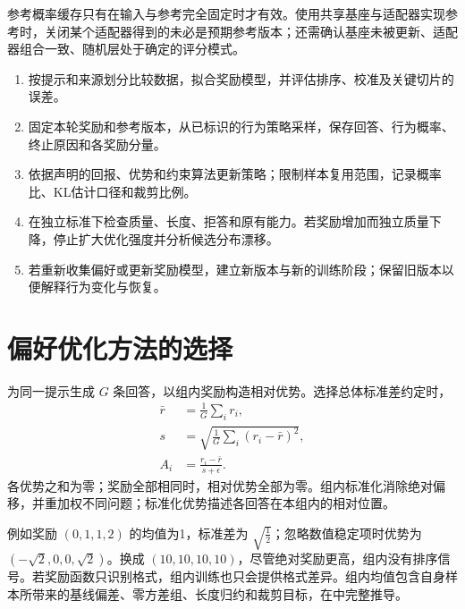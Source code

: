 \documentclass[../textbook.tex]{subfiles}
\begin{document}
参考概率缓存只有在输入与参考完全固定时才有效。使用共享基座与适配器实现参考时，关闭某个适配器得到的未必是预期参考版本；还需确认基座未被更新、适配器组合一致、随机层处于确定的评分模式。

\begin{algorithm}[奖励模型与在线策略的分阶段更新]
\begin{enumerate}
\item 按提示和来源划分比较数据，拟合奖励模型，并评估排序、校准及关键切片的误差。
\item 固定本轮奖励和参考版本，从已标识的行为策略采样，保存回答、行为概率、终止原因和各奖励分量。
\item 依据声明的回报、优势和约束算法更新策略；限制样本复用范围，记录概率比、KL估计口径和裁剪比例。
\item 在独立标准下检查质量、长度、拒答和原有能力。若奖励增加而独立质量下降，停止扩大优化强度并分析候选分布漂移。
\item 若重新收集偏好或更新奖励模型，建立新版本与新的训练阶段；保留旧版本以便解释行为变化与恢复。
\end{enumerate}
\end{algorithm}

\section{偏好优化方法的选择}
\optional
{}为同一提示生成 $G$ 条回答，以组内奖励构造相对优势\autocite{shao2024deepseekmath}。选择总体标准差约定时，
\begin{equation}\label{eq:pref-grpo-overview}
\begin{aligned}
 \bar r &= \frac1G\sum_i r_i, \\
 s &= \sqrt{\frac1G\sum_i(r_i-\bar r)^2}, \\
 A_i &= \frac{r_i-\bar r}{s+\epsilon}.
\end{aligned}
\end{equation}
各优势之和为零；奖励全部相同时，相对优势全部为零。组内标准化消除绝对偏移，并重加权不同问题；标准化优势描述各回答在本组内的相对位置。

例如奖励 $(0,1,1,2)$ 的均值为1，标准差为 $\sqrt{\frac{1}{2}}$；忽略数值稳定项时优势为 $(-\sqrt2,0,0,\sqrt2)$。换成 $(10,10,10,10)$，尽管绝对奖励更高，组内没有排序信号。若奖励函数只识别格式，组内训练也只会提供格式差异。组内均值包含自身样本所带来的基线偏差、零方差组、长度归约和裁剪目标，在中完整推导。
\end{document}
